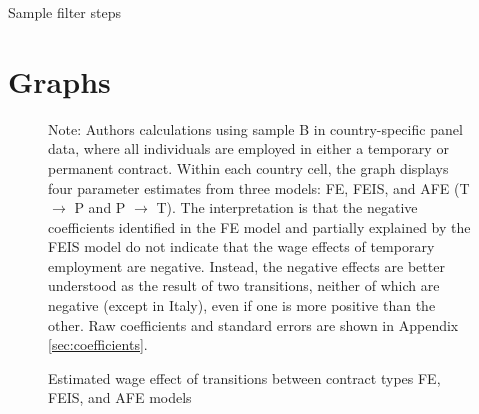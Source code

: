 \begin{table}[!h]
    \caption{Sample filter steps}
    \centering
    
    \label{table_sample_filter_steps_country}
\end{table}


\clearpage
\section{Graphs}

\begin{figure}
    \caption{Estimated wage effect of transitions between contract types FE, FEIS, and AFE models}
    \label{graph_contyp}
    \footnotesize{Note: Authors calculations using sample B in country-specific panel data, where all individuals are employed in either a temporary or permanent contract.  Within each country cell, the graph displays four parameter estimates from three models: FE, FEIS, and AFE (T $\rightarrow$ P and P $\rightarrow$ T).  The interpretation is that the negative coefficients identified in the FE model and partially explained by the FEIS model do not indicate that the wage effects of temporary employment are negative.  Instead, the negative effects are better understood as the result of two transitions, neither of which are negative (except in Italy), even if one is more positive than the other.  Raw coefficients and standard errors are shown in Appendix \ref{sec:coefficients}.}
\end{figure}

